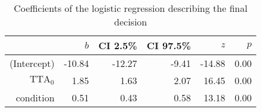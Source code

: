 \begin{table}[h]
\centering
\caption{Coefficients of the logistic regression describing the final decision}
\label{tab:decision}
\begin{tabular}{rrrrrr}
\toprule
 & $b$ & CI 2.5\% & CI 97.5\% & $z$ & $p$ \\
\midrule
(Intercept) & -10.84 & -12.27 & -9.41 & -14.88 & 0.00 \\
$\textrm{TTA}_0$ & 1.85 & 1.63 & 2.07 & 16.45 & 0.00 \\
condition & 0.51 & 0.43 & 0.58 & 13.18 & 0.00 \\
\bottomrule
\end{tabular}
\end{table}
